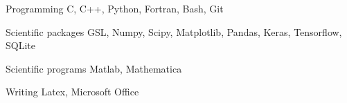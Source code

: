 

\begin{cvskills}

    \cvskill
        {Programming} %
        {C, C++, Python, Fortran, Bash, Git} %

    \cvskill
        {Scientific packages} %
        {GSL, Numpy, Scipy, Matplotlib, Pandas, Keras, Tensorflow, SQLite} %

    \cvskill
        {Scientific programs} %
        {Matlab, Mathematica} %


    \cvskill
        {Writing} %
        {Latex, Microsoft Office} %

\end{cvskills}